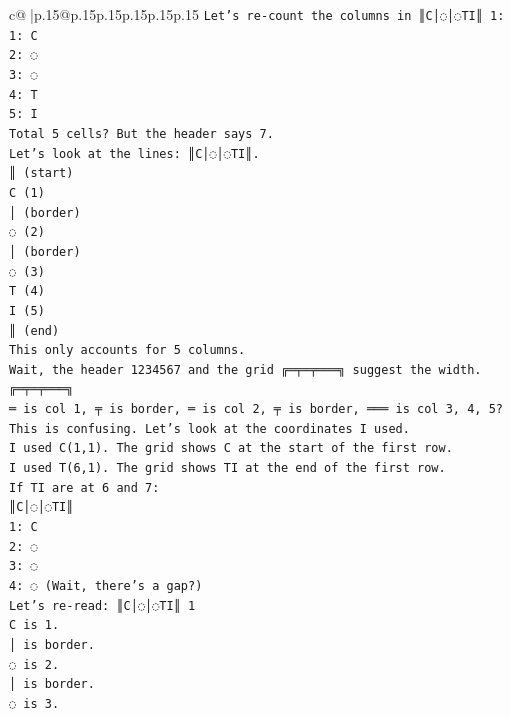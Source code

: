 \documentclass{article}
\begin{document}
{\begin{supertabular}{c@{$\;$}|p{.15\linewidth}@{}p{.15\linewidth}p{.15\linewidth}p{.15\linewidth}p{.15\linewidth}p{.15\linewidth}}
{{{\texttt{Let's re{-}count the columns in ║C│◌│◌TI║ 1:} \\
\texttt{1: C} \\
\texttt{2: ◌} \\
\texttt{3: ◌} \\
\texttt{4: T} \\
\texttt{5: I} \\
\texttt{Total 5 cells? But the header says 7.} \\
\texttt{Let's look at the lines: ║C│◌│◌TI║.} \\
\texttt{║ (start)} \\
\texttt{C (1)} \\
\texttt{│ (border)} \\
\texttt{◌ (2)} \\
\texttt{│ (border)} \\
\texttt{◌ (3)} \\
\texttt{T (4)} \\
\texttt{I (5)} \\
\texttt{║ (end)} \\
\texttt{This only accounts for 5 columns.} \\
\texttt{Wait, the header 1234567 and the grid ╔═╤═╤═══╗ suggest the width.} \\
\texttt{╔═╤═╤═══╗} \\
\texttt{═ is col 1, ╤ is border, ═ is col 2, ╤ is border, ═══ is col 3, 4, 5?} \\
\texttt{This is confusing. Let's look at the coordinates I used.} \\
\texttt{I used C(1,1). The grid shows C at the start of the first row.} \\
\texttt{I used T(6,1). The grid shows TI at the end of the first row.} \\
\texttt{If TI are at 6 and 7:} \\
\texttt{║C│◌│◌TI║} \\
\texttt{1: C} \\
\texttt{2: ◌} \\
\texttt{3: ◌} \\
\texttt{4: ◌ (Wait, there's a gap?)} \\
\texttt{Let's re{-}read: ║C│◌│◌TI║ 1} \\
\texttt{C is 1.} \\
\texttt{│ is border.} \\
\texttt{◌ is 2.} \\
\texttt{│ is border.} \\
\texttt{◌ is 3.} \\
}}}
\end{supertabular}}
\end{document}

